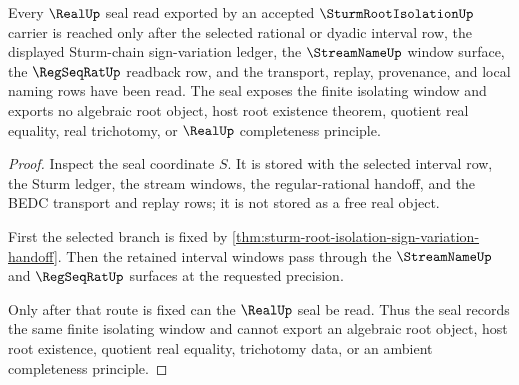\begin{theorem}
\label{thm:sturm-root-isolation-real-seal-nonescape}
Every $\RealUp$ seal read exported by an accepted $\SturmRootIsolationUp$ carrier is reached only after the selected rational or dyadic interval row, the displayed Sturm-chain sign-variation ledger, the $\StreamNameUp$ window surface, the $\RegSeqRatUp$ readback row, and the transport, replay, provenance, and local naming rows have been read. The seal exposes the finite isolating window and exports no algebraic root object, host root existence theorem, quotient real equality, real trichotomy, or $\RealUp$ completeness principle.
\end{theorem}
\begin{proof}
Inspect the seal coordinate $S$. It is stored with the selected interval row, the Sturm ledger, the stream windows, the regular-rational handoff, and the BEDC transport and replay rows; it is not stored as a free real object.

First the selected branch is fixed by \autoref{thm:sturm-root-isolation-sign-variation-handoff}. Then the retained interval windows pass through the $\StreamNameUp$ and $\RegSeqRatUp$ surfaces at the requested precision.

Only after that route is fixed can the $\RealUp$ seal be read. Thus the seal records the same finite isolating window and cannot export an algebraic root object, host root existence, quotient real equality, trichotomy data, or an ambient completeness principle.
\end{proof}

